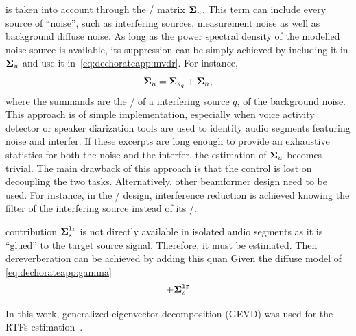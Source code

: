  is taken into account through the \xPSD/ matrix $\boldsymbol{\Sigma}_u$.
This term can include every source of ``noise'', such as interfering sources, measurement noise as well as background diffuse noise.
As long as the power spectral density of the modelled noise source is available, its suppression can be simply achieved by including it in $\boldsymbol{\Sigma}_u$ and use it in~\cref{eq:dechorateapp:mvdr}.
For instance,
\begin{equation}
    \boldsymbol{\Sigma}_u = \boldsymbol{\Sigma}_{s_q} + \boldsymbol{\Sigma}_{n}
    ,
\end{equation}
where the summands are the \xPSD/ of a interfering source $q$, of the background noise.
\\This approach is of simple implementation, especially when voice activity detector or speaker diarization tools are used to identity audio segments featuring noise and interfer.
If these excerpts are long enough to provide an exhaustive statistics for both the noise and the interfer, the estimation of $\boldsymbol{\Sigma}_u$ becomes trivial.
The main drawback of this approach is that the control is lost on decoupling the two tasks.
Alternatively, other beamformer design need to be used. For instance, in the \LCMVtxt/ design, interference reduction is achieved knowing the filter of the interfering source instead of its \xPSD/.

 contribution $\boldsymbol{\Sigma}_{s}^{\mathtt{lr}}$ is not directly available in isolated audio segments as it is ``glued'' to the target source signal.
Therefore, it must be estimated. Then dereverberation can be achieved by adding this quan
Given the diffuse model of \cref{eq:dechorateapp:gamma}
\begin{equation}
    + \boldsymbol{\Sigma}_{s}^{\mathtt{lr}}
\end{equation}

In this work, generalized eigenvector decomposition (GEVD) was used for the RTFs estimation~.

